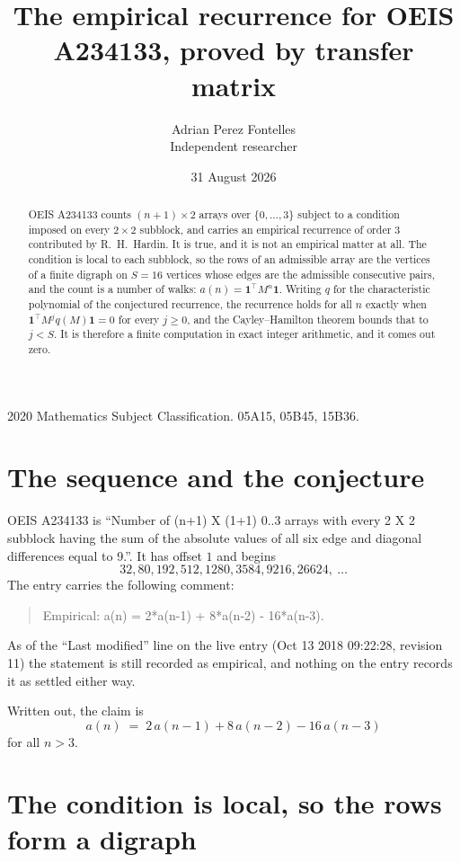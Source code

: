 \documentclass[11pt,a4paper]{article}
\title{The empirical recurrence for OEIS A234133, proved by transfer matrix}
\author{Adrian Perez Fontelles\\ \small Independent researcher}
\date{31 August 2026}
\theoremstyle{plain}
\theoremstyle{definition}
\begin{document}
\maketitle

\begin{abstract}
OEIS A234133 counts $(n+1)\times2$ arrays over $\{0,\dots,3\}$ subject to a condition imposed on
every $2\times2$ subblock, and carries an empirical recurrence of order $3$ contributed
by R.~H.~Hardin. It is true, and it is not an empirical matter at all. The condition is local
to each subblock, so the rows of an admissible array are the vertices of a finite digraph
on $S=16$ vertices whose edges are the admissible consecutive pairs, and the count is a
number of walks: $a(n)=\mathbf{1}^{\!\top}M^{n}\mathbf{1}$. Writing $q$
for the characteristic polynomial of the conjectured recurrence, the recurrence holds for all
$n$ exactly when $\mathbf{1}^{\!\top}M^{j}q(M)\mathbf{1}=0$ for every $j\ge0$, and the
Cayley--Hamilton theorem bounds that to $j<S$. It is therefore a finite computation in exact
integer arithmetic, and it comes out zero.
\end{abstract}

\noindent\small 2020 Mathematics Subject Classification. 05A15, 05B45, 15B36.\normalsize

\section{The sequence and the conjecture}

OEIS A234133 is ``Number of (n+1) X (1+1) 0..3 arrays with every 2 X 2 subblock having the sum of the absolute values of all six edge and diagonal differences equal to 9.''. It has offset $1$ and begins
\[
32, 80, 192, 512, 1280, 3584, 9216, 26624,\ \dots
\]
The entry carries the following comment:
\begin{quote}\small
Empirical: a(n) = 2*a(n-1) + 8*a(n-2) - 16*a(n-3).
\end{quote}
As of the ``Last modified'' line on the live entry (Oct 13 2018 09:22:28, revision 11) the statement is
still recorded as empirical, and nothing on the entry records it as settled either way.

Written out, the claim is
\begin{equation}\label{eq:conj}
a(n)\;=\;2\,a(n-1) + 8\,a(n-2) - 16\,a(n-3)
\end{equation}
for all $n>3$.

\section{The condition is local, so the rows form a digraph}
\end{document}
